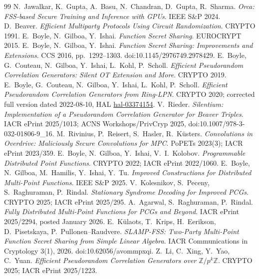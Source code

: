 \documentclass[11pt]{article}
\begin{document}
\begin{thebibliography}{99}
N.~Jawalkar, K.~Gupta, A.~Basu, N.~Chandran, D.~Gupta, R.~Sharma.
\emph{Orca: FSS-based Secure Training and Inference with GPUs}.
IEEE S\&P 2024.
D.~Beaver. \emph{Efficient Multiparty Protocols Using Circuit Randomization}.
CRYPTO 1991.
E.~Boyle, N.~Gilboa, Y.~Ishai. \emph{Function Secret Sharing}.
EUROCRYPT 2015.
E.~Boyle, N.~Gilboa, Y.~Ishai.
\emph{Function Secret Sharing: Improvements and Extensions}.
CCS 2016, pp.~1292--1303. doi:10.1145/2976749.2978429.
E.~Boyle, G.~Couteau, N.~Gilboa, Y.~Ishai, L.~Kohl, P.~Scholl.
\emph{Efficient Pseudorandom Correlation Generators: Silent OT Extension and
More}. CRYPTO 2019.
E.~Boyle, G.~Couteau, N.~Gilboa, Y.~Ishai, L.~Kohl, P.~Scholl.
\emph{Efficient Pseudorandom Correlation Generators from Ring-LPN}.
CRYPTO 2020; corrected full version dated 2022-08-10,
HAL \href{https://hal.science/hal-03374154/document}{hal-03374154}.
V.~Rieder.
\emph{Silentium: Implementation of a Pseudorandom Correlation Generator for
Beaver Triples}.
IACR ePrint 2025/1013; ACNS Workshops/PrivCryp 2025,
doi:10.1007/978-3-032-01806-9\_16.
M.~Rivinius, P.~Reisert, S.~Hasler, R.~K\"usters.
\emph{Convolutions in Overdrive: Maliciously Secure Convolutions for MPC}.
PoPETs 2023(3); IACR ePrint 2023/359.
E.~Boyle, N.~Gilboa, Y.~Ishai, V.~I.~Kolobov.
\emph{Programmable Distributed Point Functions}.
CRYPTO 2022; IACR ePrint 2022/1060.
E.~Boyle, N.~Gilboa, M.~Hamilis, Y.~Ishai, Y.~Tu.
\emph{Improved Constructions for Distributed Multi-Point Functions}.
IEEE S\&P 2025.
V.~Kolesnikov, S.~Peceny, S.~Raghuraman, P.~Rindal.
\emph{Stationary Syndrome Decoding for Improved PCGs}.
CRYPTO 2025; IACR ePrint 2025/295.
A.~Agarwal, S.~Raghuraman, P.~Rindal.
\emph{Fully Distributed Multi-Point Functions for PCGs and Beyond}.
IACR ePrint 2025/2294, posted January 2026.
E.~K\"ulaots, T.~Krips, H.~Eerikson, D.~Pisetskaya,
P.~Pullonen--Raudvere.
\emph{SLAMP-FSS: Two-Party Multi-Point Function Secret Sharing from Simple
Linear Algebra}.
IACR Communications in Cryptology 3(1), 2026.
doi:10.62056/avommpxqi.
Z.~Li, C.~Xing, Y.~Yao, C.~Yuan.
\emph{Efficient Pseudorandom Correlation Generators over
$\mathbb Z/p^k\mathbb Z$}.
CRYPTO 2025; IACR ePrint 2025/1223.

\end{thebibliography}
\end{document}
